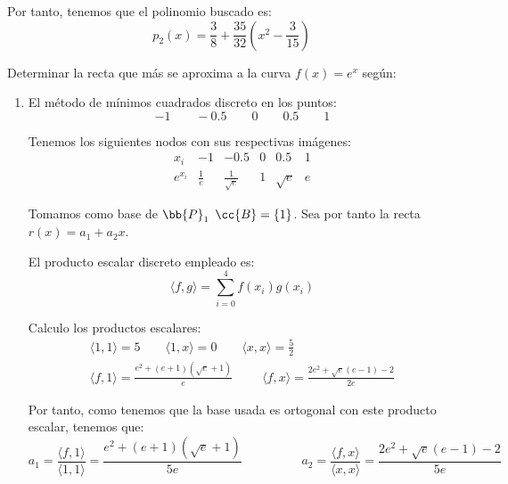 \begin{ejercicio}
\begin{enumerate}
        Por tanto, tenemos que el polinomio buscado es:
        \begin{equation*}
            p_2(x)=\frac{3}{8} +\frac{35}{32}
            \left(x^2-\frac{3}{15}\right)
        \end{equation*}
        
    \end{enumerate}
\end{ejercicio}


\begin{ejercicio}\label{Ejercicio5}
    Determinar la recta que más se aproxima a la curva $f(x) = e^x$ según:
    \begin{enumerate}
        \item El método de mínimos cuadrados discreto en los puntos:
        \begin{equation*}
            -1\qquad -0.5 \qquad 0 \qquad0.5 \qquad1
        \end{equation*}

        Tenemos los siguientes nodos con sus respectivas imágenes:
        \begin{equation*}
            \begin{array}{c|ccccc}
                x_i & -1 & -0.5 & 0 & 0.5 & 1 \\ \hline
                e^{x_i} & \frac{1}{e} & \frac{1}{\sqrt{e}} & 1 & \sqrt{e} & e
            \end{array}
        \end{equation*}

        Tomamos como base de $\bb{P}_1$ $\cc{B}=\{1\}$. Sea por tanto la recta $r(x)=a_1 + a_2x$.

        El producto escalar discreto empleado es:
        \begin{equation*}
            \langle f,g\rangle = \sum_{i=0}^4 f(x_i)g(x_i)
        \end{equation*}
    
        Calculo los productos escalares:
        \begin{gather*}
            \langle 1,1\rangle = 5 \qquad
            \langle 1,x\rangle = 0 \qquad
            \langle x,x\rangle = \frac{5}{2}
            \\
            \langle f,1\rangle = \frac{e^2 + (e+1)(\sqrt{e}+1)}{e}
            \hspace{1cm}
            \langle f,x\rangle = \frac{2e^2 +\sqrt{e}(e-1)-2}{2e}
        \end{gather*}

        Por tanto, como tenemos que la base usada es ortogonal con este producto escalar, tenemos que:
        \begin{equation*}
            a_1 = \frac{\langle f,1\rangle}{\langle 1,1\rangle} = \frac{e^2 + (e+1)(\sqrt{e}+1)}{5e}
            \hspace{2cm}
            a_2 = \frac{\langle f,x\rangle}{\langle x,x\rangle} = \frac{2e^2 +\sqrt{e}(e-1)-2}{5e}
        \end{equation*}


\end{enumerate}
\end{ejercicio}
